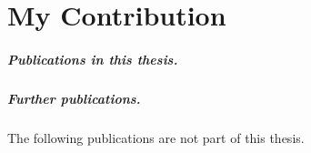 \chapter*{My Contribution}

%
\paragraph{Publications in this thesis.}


\begingroup
\setlength{\emergencystretch}{3em} %
\begin{refsection}
	\nocite{CANS:BloEidJuh18} 
	\nocite{EPRINT:BloEidJuh18b}
	\nocite{CCS:BBDE19}
	\nocite{EPRINT:BBDE19}
	\printbibliography[heading=none]
\end{refsection}
\endgroup
%


\paragraph{Further publications.}
The following publications are not part of this thesis.
\begingroup
\setlength{\emergencystretch}{3em} %
\begin{refsection}
	\nocite{DBLP:conf/cans/BobolzEKRS21}
	\nocite{EPRINT:BEHF21}
	\nocite{ASIACCS:BEKSS20}
	\nocite{DBLP:conf/IEEEares/BemmannBBBDEEHJ18}
	\nocite{RSA:BloEidJuh18}
	\printbibliography[heading=none]
\end{refsection}
\endgroup